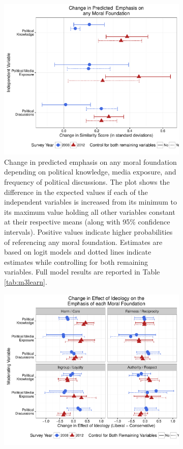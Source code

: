\documentclass[12pt]{article}
\begin{document}
\begin{figure}[h]
  \centering
  \caption{Models predicting probabilities to reference any moral foundation including 2008 ANES data.}
  \begin{subfigure}[t]{0.49\textwidth}
    \includegraphics[scale=.4]{../calc/fig/appD7learn.pdf}
    \caption{Change in predicted emphasis on any moral foundation depending on political knowledge, media exposure, and frequency of political discussions. The plot shows the difference in the expected values if each of the independent variables is increased from its minimum to its maximum value holding all other variables constant at their respective means (along with 95\% confidence intervals). Positive values indicate higher probabilities of referencing any moral foundation. Estimates are based on logit models and dotted lines indicate estimates while controlling for both remaining variables. Full model results are reported in Table \ref{tab:m3learn}.}\label{fig:appD7learn}
  \end{subfigure}
  \begin{subfigure}[t]{0.49\textwidth}
    \includegraphics[scale=.4]{../calc/fig/appD8ideolearn.pdf}

\end{subfigure}
\end{figure}
\end{document}
